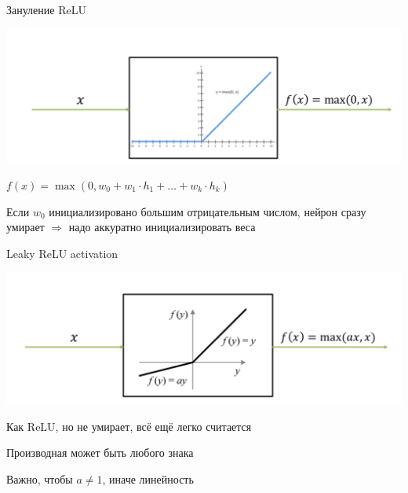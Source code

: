 \documentclass[notes,12pt, aspectratio=169]{beamer}
\newenvironment{wideitemize}{\itemize\addtolength{\itemsep}{10pt}}{\enditemize}
\begin{document}
\begin{frame}{Зануление ReLU}
\begin{center}
	\includegraphics[width=.7\linewidth]{relu_activation.png}
\end{center}

\begin{wideitemize}
	\item   $f(x) = \max(0, w_0 + w_1 \cdot h_1 + \ldots + w_k \cdot h_k)$
	
	\item  Если $w_0$ инициализировано большим отрицательным числом, нейрон сразу умирает $\Rightarrow$ надо аккуратно инициализировать веса
\end{wideitemize}
\end{frame}


\begin{frame}{Leaky ReLU activation}
\begin{center}
\includegraphics[width=.7\linewidth]{leaky_relu_activation.png}
\end{center}

\begin{itemize}
{ \color{green} 
\item Как ReLU, но не умирает, всё ещё легко считается
\item Производная может быть любого знака
\item Важно, чтобы $a \ne 1$, иначе линейность
} 
\end{itemize}
\end{frame}
\end{document}
